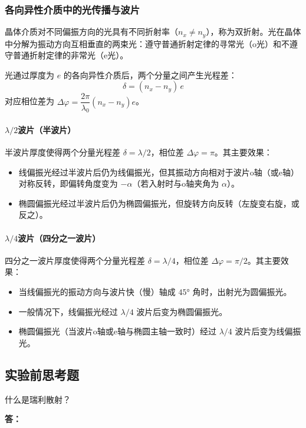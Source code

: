 \documentclass[dvipsnames, svgnames,a4paper,11pt]{article}
\newcommand{\answerblank}[1][3.8cm]{%
  \par\nopagebreak[4]\noindent\textbf{答：}\par\nopagebreak[4]\vspace*{#1}}
\begin{document}
\subsubsection{各向异性介质中的光传播与波片}

晶体介质对不同偏振方向的光具有不同折射率（$n_x \neq n_y$），称为双折射。光在晶体中分解为振动方向互相垂直的两束光：遵守普通折射定律的寻常光（o光）和不遵守普通折射定律的非常光（e光）。

光通过厚度为 $e$ 的各向异性介质后，两个分量之间产生光程差：
\begin{equation}
    \delta = (n_x - n_y)\,e
\end{equation}
对应相位差为 $\Delta\varphi = \dfrac{2\pi}{\lambda_0}(n_x - n_y)e$。

\paragraph{$\lambda/2$波片（半波片）}

半波片厚度使得两个分量光程差 $\delta = \lambda/2$，相位差 $\Delta\varphi = \pi$。其主要效果：
\begin{itemize}
    \item 线偏振光经过半波片后仍为线偏振光，但其振动方向相对于波片o轴（或e轴）对称反转，即偏转角度变为 $-\alpha$（若入射时与o轴夹角为 $\alpha$）。
    \item 椭圆偏振光经过半波片后仍为椭圆偏振光，但旋转方向反转（左旋变右旋，或反之）。
\end{itemize}

\paragraph{$\lambda/4$波片（四分之一波片）}

四分之一波片厚度使得两个分量光程差 $\delta = \lambda/4$，相位差 $\Delta\varphi = \pi/2$。其主要效果：
\begin{itemize}
    \item 当线偏振光的振动方向与波片快（慢）轴成 $45°$ 角时，出射光为圆偏振光。
    \item 一般情况下，线偏振光经过 $\lambda/4$ 波片后变为椭圆偏振光。
    \item 椭圆偏振光（当波片o轴或e轴与椭圆主轴一致时）经过 $\lambda/4$ 波片后变为线偏振光。
\end{itemize}

\subsection{实验前思考题}
\begin{question}
	什么是瑞利散射？
\end{question}
\answerblank[3.8cm]
\end{document}
